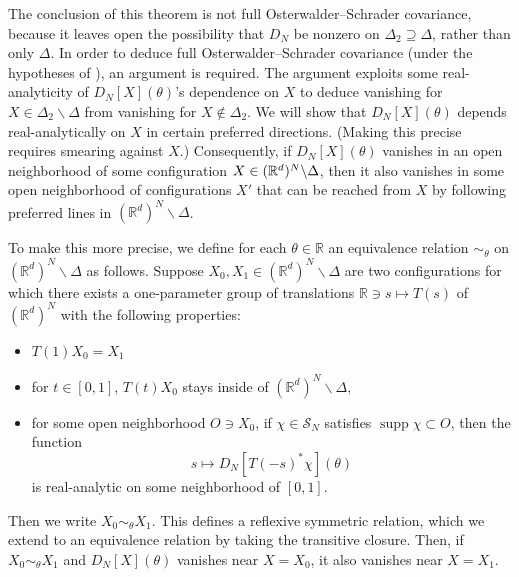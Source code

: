 \documentclass[11pt, letterpaper, reqno]{amsart}
\theoremstyle{definition}
\theoremstyle{remark}
\newcommand{\bbR}{\mathbb{R}}
\newcommand{\calS}{\mathcal{S}}
\begin{document}
The conclusion of this theorem is not full Osterwalder--Schrader covariance, because it leaves open the possibility that $D_N$ be nonzero on $\Delta_2\supseteq \Delta $, rather than only $\Delta$. 
In order to deduce full Osterwalder--Schrader covariance (under the hypotheses of ), an argument is required.
The argument exploits some real-analyticity of $D_N[X](\theta)$'s dependence on $X$ to deduce vanishing for $X\in \Delta_2\backslash \Delta$ from vanishing for $X\notin \Delta_2$. 
We will show that $D_N[X](\theta)$ depends real-analytically on $X$ in certain preferred directions. (Making this precise requires smearing against $X$.) 
Consequently, if $D_N[X](\theta)$ vanishes in an open neighborhood of some configuration $X \in \smash{(\bbR^d)^N}\backslash \Delta$, then it also vanishes in some open neighborhood of configurations $X'$ that can be reached from $X$ by following preferred lines in $(\bbR^d)^N\backslash \Delta$. 


To make this more precise, we define for each $\theta \in \bbR$ an equivalence relation $\sim_\theta$ on $(\bbR^d)^N\backslash \Delta$ as follows. Suppose $X_0,X_1 \in (\bbR^d)^N\backslash \Delta$ are two configurations for which there exists a one-parameter group of translations $\bbR\ni s\mapsto T(s)$ of $(\bbR^d)^N$ with the following properties:
\begin{itemize}
    \item $T(1) X_0= X_1$
    \item for $t\in [0,1]$, $T(t)X_0$ stays inside of $(\bbR^d)^N\backslash \Delta$, 
    \item  for some open neighborhood $O\ni X_0$, if $\chi\in \calS_N$ satisfies $\operatorname{supp} \chi \subset O$, then the function 
    \begin{equation}
        s\mapsto D_N[T(-s)^* \chi](\theta) 
    \end{equation}
    is real-analytic on some neighborhood of $[0,1]$. 
\end{itemize}
Then we write $X_0\sim_\theta X_1$. This defines a reflexive symmetric relation, which we extend to an equivalence relation by taking the transitive closure. Then, if $X_0\sim_\theta X_1$ and $D_N[X](\theta)$ vanishes near $X=X_0$, it also vanishes near $X=X_1$. 
\end{document}
